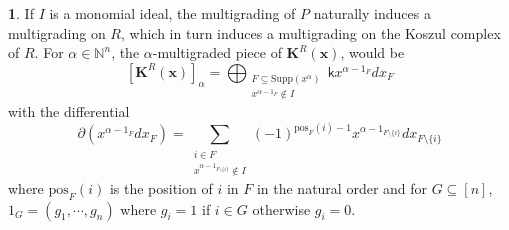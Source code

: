 \documentclass[10pt,reqno]{amsart}
\theoremstyle{definition}
\newtheorem{chunk}[subsection]{}
\theoremstyle{remark}
\numberwithin{equation}{section}
\newcommand{\kk}{\mathsf k}
\numberwithin{equation}{section}
\begin{document}
\begin{chunk}
    If $I$ is a monomial ideal, the multigrading of $P$ naturally induces a multigrading on $R$, which in turn induces a multigrading on the Koszul complex of $R$. For $\alpha\in \mathbb{N}^n$, the $\alpha$-multigraded piece of $\mathbf{K}^{R}(\mathbf{x})$, would be\[
    [\mathbf{K}^R(\mathbf{x})]_{\alpha}=\bigoplus_{\substack{F\subseteq\mathrm{Supp}(x^{\alpha})\\ x^{\alpha-1_F}\notin I}}\kk x^{\alpha-1_F}dx_F
 \] 
 with the differential
 \[
\partial(x^{\alpha-1_F}dx_F)=\sum_{\substack{i\in F\\ x^{\alpha-1_{F\setminus \{i\} }}\notin I }} (-1)^{\mathrm{pos}_F(i)-1}x^{\alpha-1_{F\setminus \{i\} }}dx_{F\setminus \{i\} }
\]
where $\mathrm{pos}_F(i)$ is the position of $i$ in $F$ in the natural order and for $G\subseteq [n]$, $1_{G}=(g_1,\cdots,g_n)$ where $g_i=1$ if $i\in G$ otherwise $g_i=0$. 
\end{chunk}
\end{document}
